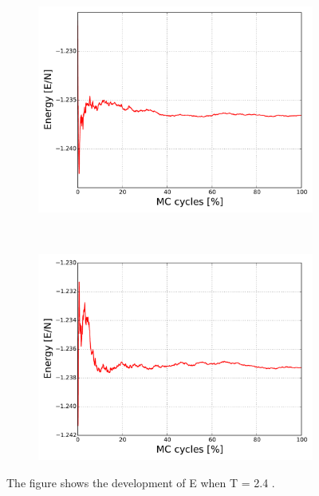 \begin{figure}[H]
    \centering
    \begin{subfigure}{0.5\textwidth}
        \centering
        \includegraphics[width=\linewidth]{result/bilder/20x20/E-N20-T24}
        \caption{}
    \end{subfigure}%
    ~ 
    \begin{subfigure}{0.5\textwidth}
        \centering
        \includegraphics[width=\linewidth]{result/bilder/20x20/E-N20-T24-RNG}
        \caption{}
    \end{subfigure}
    \caption{The figure shows the development of E when T = 2.4 . }
    \label{fig:}
\end{figure}

